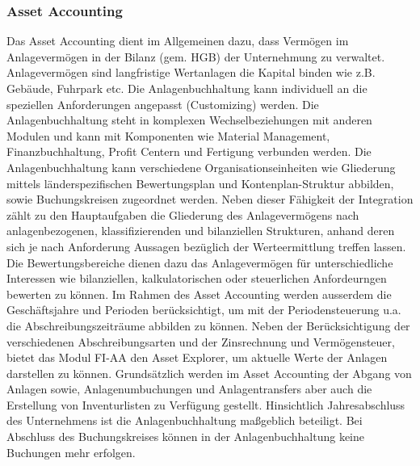 \subsubsection{Asset Accounting} %
Das Asset Accounting dient im Allgemeinen dazu, dass Vermögen im Anlagevermögen in der Bilanz (gem. HGB) der Unternehmung zu verwaltet. Anlagevermögen sind langfristige Wertanlagen die Kapital binden wie z.B. Gebäude, Fuhrpark etc. Die Anlagenbuchhaltung kann individuell an die speziellen Anforderungen angepasst (Customizing) werden. 
Die Anlagenbuchhaltung steht in komplexen Wechselbeziehungen mit anderen Modulen und kann mit Komponenten wie Material Management, Finanzbuchhaltung, Profit Centern und Fertigung verbunden werden. Die Anlagenbuchhaltung kann verschiedene Organisationseinheiten wie Gliederung mittels länderspezifischen Bewertungsplan und Kontenplan-Struktur abbilden, sowie Buchungskreisen zugeordnet werden.
Neben dieser Fähigkeit der Integration zählt zu den Hauptaufgaben die Gliederung des Anlagevermögens nach anlagenbezogenen, klassifizierenden und bilanziellen Strukturen, anhand deren sich je nach Anforderung Aussagen bezüglich der Werteermittlung treffen lassen. Die Bewertungsbereiche dienen dazu das Anlagevermögen für unterschiedliche Interessen wie bilanziellen, kalkulatorischen oder steuerlichen Anfordeurngen bewerten zu können.
Im Rahmen des Asset Accounting werden ausserdem die Geschäftsjahre und Perioden berücksichtigt, um mit der Periodensteuerung u.a. die Abschreibungszeiträume abbilden zu können. Neben der Berücksichtigung der verschiedenen Abschreibungsarten und der Zinsrechnung und Vermögensteuer, bietet das Modul FI-AA den Asset Explorer, um aktuelle Werte der Anlagen darstellen zu können. Grundsätzlich werden im Asset Accounting der Abgang von Anlagen sowie, Anlagenumbuchungen und Anlagentransfers aber auch die Erstellung von Inventurlisten zu Verfügung gestellt. 
Hinsichtlich Jahresabschluss des Unternehmens ist die Anlagenbuchhaltung maßgeblich beteiligt. Bei Abschluss des Buchungskreises können in der Anlagenbuchhaltung keine Buchungen mehr erfolgen.


